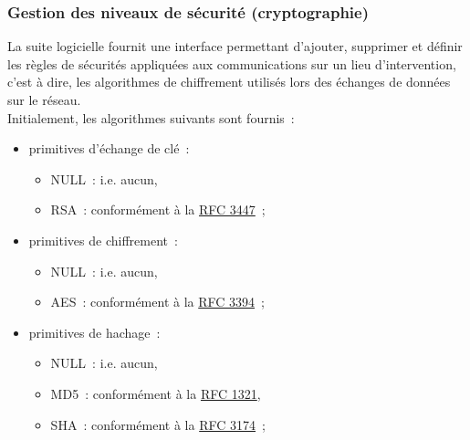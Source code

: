 \subsubsection{Gestion des niveaux de sécurité (cryptographie)}
La suite logicielle fournit une interface permettant d'ajouter, supprimer et définir les règles de sécurités appliquées aux communications sur un lieu d'intervention, c'est à dire, les algorithmes de chiffrement utilisés lors des échanges de données sur le réseau.
\\
Initialement, les algorithmes suivants sont fournis~:
\begin{itemize}
	\item primitives d'échange de clé~:
	\begin{itemize}
		\item NULL~: i.e. aucun,
		\item RSA~: conformément à la \href{http://tools.ietf.org/html/rfc3447}{RFC 3447}~;
	\end{itemize}
	\item primitives de chiffrement~:
	\begin{itemize}
		\item NULL~: i.e. aucun,
		\item AES~: conformément à la \href{http://tools.ietf.org/html/rfc3394}{RFC 3394}~;
	\end{itemize}
	\item primitives de hachage~:
	\begin{itemize}
		\item NULL~: i.e. aucun,
		\item MD5~: conformément à la \href{http://tools.ietf.org/html/rfc1321}{RFC 1321},
		\item SHA~: conformément à la \href{http://tools.ietf.org/html/rfc3174}{RFC 3174}~;
	\end{itemize}
\end{itemize}


